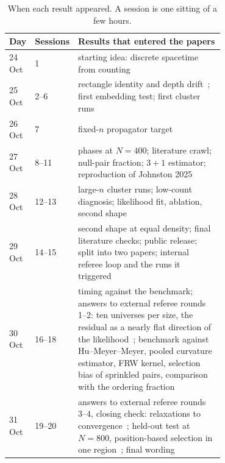 \documentclass[11pt,a4paper]{article}
\begin{document}
\begin{table}[h]
\centering\small
\begin{tabular}{@{}llp{0.7\linewidth}@{}}
\toprule
Day & Sessions & Results that entered the papers \\
\midrule
24 Oct & 1 & starting idea: discrete spacetime from counting \\
25 Oct & 2--6 & rectangle identity and depth drift~\cite{Toolkit}; first embedding test; first cluster runs \\
26 Oct & 7 & fixed-$n$ propagator target~\cite{Toolkit} \\
27 Oct & 8--11 & phases at $N=400$; literature crawl; null-pair fraction; $3+1$ estimator; reproduction of Johnston 2025~\cite{Embedding} \\
28 Oct & 12--13 & large-$n$ cluster runs; low-count diagnosis; likelihood fit, ablation, second shape~\cite{Embedding} \\
29 Oct & 14--15 & second shape at equal density; final literature checks; public release; split into two papers; internal referee loop and the runs it triggered \\
30 Oct & 16--18 & timing against the benchmark; answers to external referee rounds 1--2: ten universes per size, the residual as a nearly flat direction of the likelihood~\cite{Embedding}; benchmark against Hu--Meyer--Meyer, pooled curvature estimator, FRW kernel, selection bias of sprinkled pairs, comparison with the ordering fraction~\cite{Toolkit} \\
31 Oct & 19--20 & answers to external referee rounds 3--4, closing check: relaxations to convergence~\cite{Embedding}; held-out test at $N=800$, position-based selection in one region~\cite{Toolkit}; final wording \\
\bottomrule
\end{tabular}
\caption{When each result appeared. A session is one sitting of a few hours.}\label{tab:timeline}
\end{table}
\end{document}
